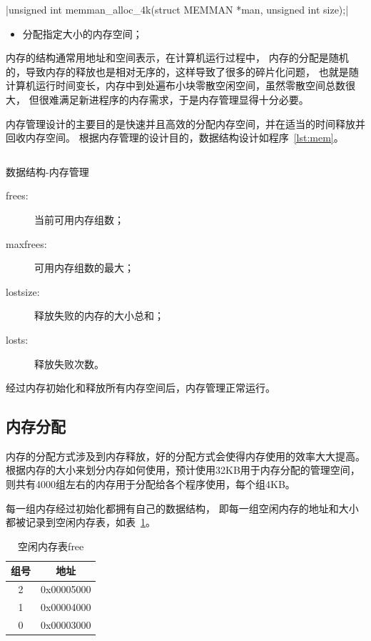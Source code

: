 \csingle|unsigned int memman_alloc_4k(struct MEMMAN *man, unsigned int size);|
\begin{itemize}
  \item 分配指定大小的内存空间；\\
\end{itemize}

内存的结构通常用地址和空间表示，在计算机运行过程中，
内存的分配是随机的，导致内存的释放也是相对无序的，这样导致了很多的碎片化问题，
也就是随计算机运行时间变长，内存中到处遍布小块零散空闲空间，虽然零散空间总数很大，
但很难满足新进程序的内存需求，于是内存管理显得十分必要。

内存管理设计的主要目的是快速并且高效的分配内存空间，并在适当的时间释放并回收内存空间。
根据内存管理的设计目的，数据结构设计如程序~\ref{lst:mem}。

\begin{listing}[H]
  \inputminted[tabsize=2, firstline=137, lastline=143,
    linenos=true]{c}{../ZOS/src/kernel/bootpack.h}
  \caption{数据结构-内存管理}
  \label{lst:mem}
\end{listing}

\begin{description}
\item[frees:]当前可用内存组数；
\item[maxfrees:]可用内存组数的最大；
\item[lostsize:]释放失败的内存的大小总和；
\item[losts:]释放失败次数。
\end{description}

经过内存初始化和释放所有内存空间后，内存管理正常运行。

\subsection{内存分配}

内存的分配方式涉及到内存释放，好的分配方式会使得内存使用的效率大大提高。
根据内存的大小来划分内存如何使用，预计使用32KB用于内存分配的管理空间，
则共有4000组左右的内存用于分配给各个程序使用，每个组4KB。

每一组内存经过初始化都拥有自己的数据结构，
即每一组空闲内存的地址和大小都被记录到空闲内存表，如表~\ref{tab:free}。

\begin{table}[h]
  \centering
  \begin{tabular}{cc}
    \hline
    组号 & 地址 \\\hline
    2 & 0x00005000 \\ 
    1 & 0x00004000 \\
    0 & 0x00003000 \\\hline    
  \end{tabular}
  \caption{空闲内存表free}
  \label{tab:free}
\end{table}

